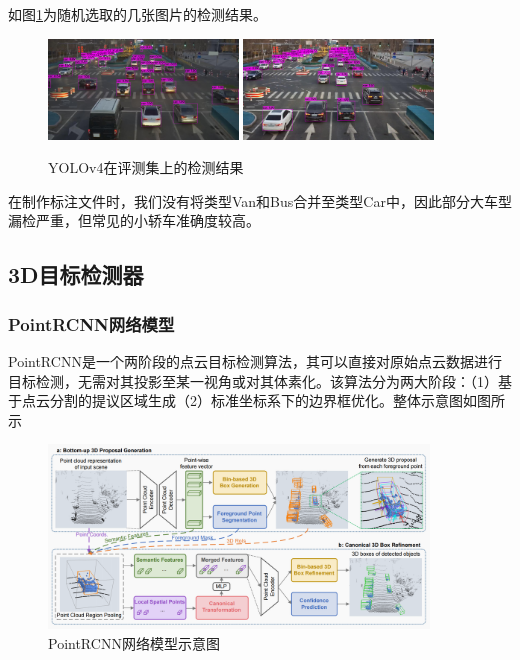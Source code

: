 如图\ref{fig24}为随机选取的几张图片的检测结果。
\begin{figure}[htb] 
    \center
    \includegraphics[width=0.45\textwidth]{figure/fig22.png}
    \includegraphics[width=0.45\textwidth]{figure/fig24.png}
    \caption{YOLOv4在评测集上的检测结果}
    \label{fig24}
\end{figure}
在制作标注文件时，我们没有将类型Van和Bus合并至类型Car中，因此部分大车型漏检严重，但常见的小轿车准确度较高。

\subsection{3D目标检测器}

\subsubsection{PointRCNN网络模型}

PointRCNN\cite{shi2019pointrcnn}是一个两阶段的点云目标检测算法，其可以直接对原始点云数据进行目标检测，无需对其投影至某一视角或对其体素化。该算法分为两大阶段：（1）基于点云分割的提议区域生成（2）标准坐标系下的边界框优化。整体示意图如图所示

\begin{figure}[htb] 
    \center
    \includegraphics[width=0.9\textwidth]{figure/fig27.png}
    \caption{PointRCNN网络模型示意图\cite{shi2019pointrcnn}}
    \label{fig27}
\end{figure}

